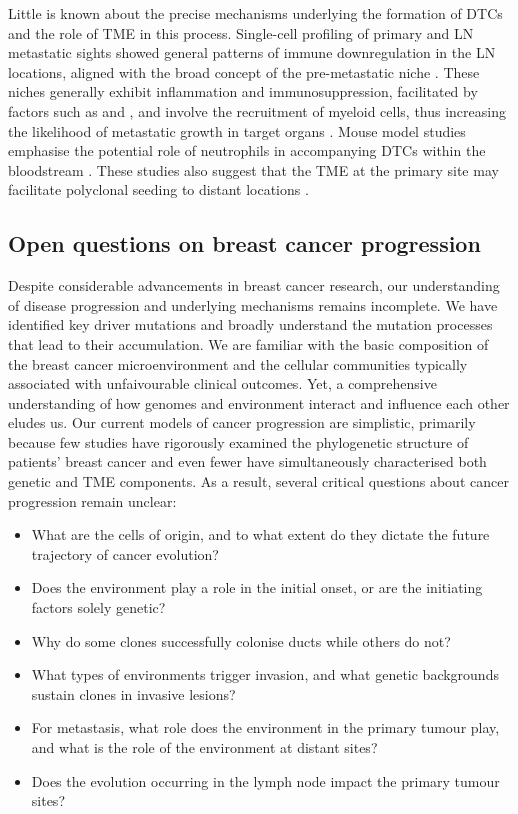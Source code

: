 Little is known about the precise mechanisms underlying the formation of \acp{DTC} and the role of \ac{TME} in this process. Single-cell profiling of primary and \ac{LN} metastatic sights showed general patterns of immune downregulation in the \ac{LN} locations, aligned with the broad concept of the pre-metastatic niche  \parencite{Liu2022-mt}. These niches generally exhibit inflammation and immunosuppression, facilitated by factors such as  and , and involve the recruitment of myeloid cells, thus increasing the likelihood of metastatic growth in target organs \parencite{Peinado2017-hz}. Mouse model studies emphasise the potential role of neutrophils in accompanying \acp{DTC} within the bloodstream  \parencite{Szczerba2019-mt}. These studies also suggest that the \ac{TME} at the primary site may facilitate polyclonal seeding to distant locations \parencite{Cheung2016-nb}.

\subsection{Open questions on breast cancer progression}

Despite considerable advancements in breast cancer research, our understanding of disease progression and underlying mechanisms remains incomplete. We have identified key driver mutations and broadly understand the mutation processes that lead to their accumulation. We are familiar with the basic composition of the breast cancer microenvironment and the cellular communities typically associated with unfaivourable clinical outcomes. Yet, a comprehensive understanding of how genomes and environment interact and influence each other eludes us. Our current models of cancer progression are simplistic, primarily because few studies have rigorously examined the phylogenetic structure of patients' breast cancer and even fewer have simultaneously characterised both genetic and \ac{TME} components. As a result, several critical questions about cancer progression remain unclear:

\begin{itemize}
    \item What are the cells of origin, and to what extent do they dictate the future trajectory of cancer evolution?
    \item Does the environment play a role in the initial onset, or are the initiating factors solely genetic?
    \item Why do some clones successfully colonise ducts while others do not?
    \item What types of environments trigger invasion, and what genetic backgrounds sustain clones in invasive lesions?
    \item For metastasis, what role does the environment in the primary tumour play, and what is the role of the environment at distant sites?
    \item Does the evolution occurring in the lymph node impact the primary tumour sites?
\end{itemize}

